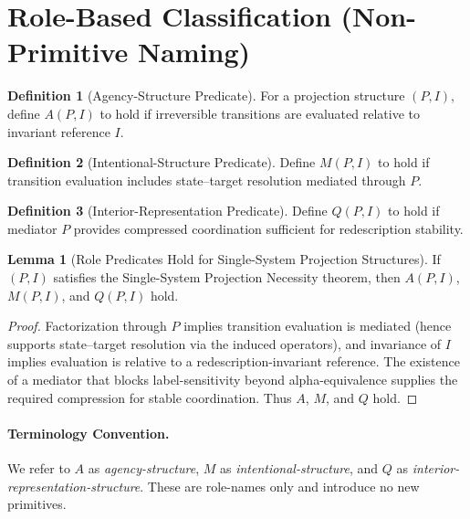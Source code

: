 \documentclass[11pt]{article}
\theoremstyle{definition}
\newtheorem{definition}{Definition}
\newtheorem{lemma}{Lemma}
\begin{document}
\section{Role-Based Classification (Non-Primitive Naming)}

\begin{definition}[Agency-Structure Predicate]
For a projection structure $(P,I)$, define $A(P,I)$ to hold if irreversible transitions are evaluated relative to invariant reference $I$.
\end{definition}

\begin{definition}[Intentional-Structure Predicate]
Define $M(P,I)$ to hold if transition evaluation includes state--target resolution mediated through $P$.
\end{definition}

\begin{definition}[Interior-Representation Predicate]
Define $Q(P,I)$ to hold if mediator $P$ provides compressed coordination sufficient for redescription stability.
\end{definition}

\begin{lemma}[Role Predicates Hold for Single-System Projection Structures]
If $(P,I)$ satisfies the Single-System Projection Necessity theorem, then $A(P,I)$, $M(P,I)$, and $Q(P,I)$ hold.
\end{lemma}

\begin{proof}
Factorization through $P$ implies transition evaluation is mediated (hence supports state--target resolution via the induced operators),
and invariance of $I$ implies evaluation is relative to a redescription-invariant reference. The existence of a mediator that blocks
label-sensitivity beyond alpha-equivalence supplies the required compression for stable coordination. Thus $A$, $M$, and $Q$ hold.
\end{proof}

\paragraph{Terminology Convention.}
We refer to $A$ as \emph{agency-structure}, $M$ as \emph{intentional-structure}, and $Q$ as \emph{interior-representation-structure}.
These are role-names only and introduce no new primitives.

\end{document}
